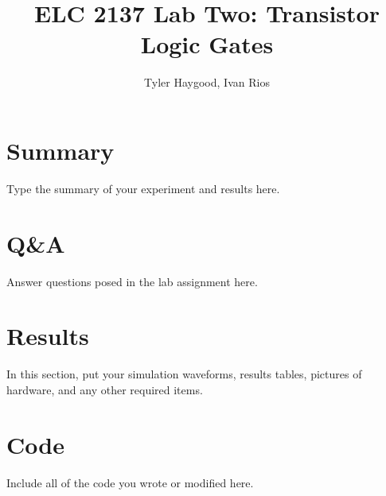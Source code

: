\documentclass[]{report}
\begin{document}
	
	\title{ELC 2137 Lab Two: Transistor Logic Gates}
	\author{Tyler Haygood, Ivan Rios}
	\maketitle
	
	\section*{Summary}
	
	Type the summary of your experiment and results here.  
	
	\section*{Q\&A}
	
	Answer questions posed in the lab assignment here.
	
	\section*{Results}
	
	In this section, put your simulation waveforms, results tables, pictures of hardware, and any other required items.
	
	\section*{Code}
	Include all of the code you wrote or modified here.
\end{document}
